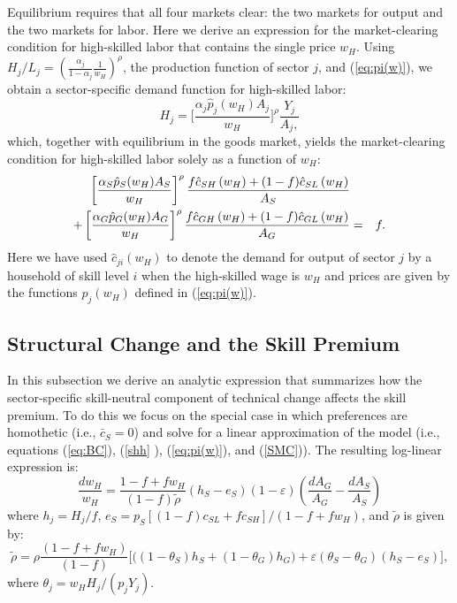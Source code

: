 \documentclass[12pt,english]{article}
\begin{document}
{\normalsize Equilibrium requires that all four markets clear: the two
markets for output and the two markets for labor. Here we derive an
expression for the market-clearing condition for high-skilled labor that
contains the single price $w_{H}$. Using $H_{j}/L_{j}=\left( \frac{\alpha
_{j}}{1-\alpha _{j}}\frac{1}{w_{H}}\right) ^{\rho }$, the production
function of sector $j$, and (\ref{eq:pi(w)}), we obtain a sector-specific
demand function for high-skilled labor: 
\begin{equation}
H_{j}=\bigg[\frac{\alpha _{j}\hat{p}_{j}(w_{H})A_{j}}{w_{H}}\bigg]^{\rho }%
\frac{Y_{j}}{A_{j},}  \label{H_i}
\end{equation}%
which, together with equilibrium in the goods market, yields the
market-clearing condition for high-skilled labor solely as a function of $%
w_{H}$: 
\begin{eqnarray}
\left[ \frac{\alpha _{S}\hat{p}_{S}(w_{H})A_{S}}{w_{H}}\right] ^{\rho }\frac{%
f\hat{c}_{SH}\left( w_{H}\right) +(1-f)\hat{c}_{SL}\left( w_{H}\right) }{%
A_{S}} &&  \notag \\
+\left[ \frac{\alpha _{G}\hat{p}_{G}(w_{H})A_{G}}{w_{H}}\right] ^{\rho }%
\frac{f\hat{c}_{GH}\left( w_{H}\right) +(1-f)\hat{c}_{GL}\left( w_{H}\right) 
}{A_{G}} &=&f.  \label{SMC}
\end{eqnarray}%
Here we have used $\hat{c}_{ji}(w_{H})$ to denote the demand for output of
sector $j$ by a household of skill level $i$ when the high-skilled wage is $%
w_{H}$ and prices are given by the functions $\hat{p}_{j}(w_{H})$ defined in
(\ref{eq:pi(w)}). }

\subsection{Structural Change and the Skill Premium}

{\normalsize In this subsection we derive an analytic expression that
summarizes how the sector-specific skill-neutral component of technical
change affects the skill premium. To do this we focus on the special case in
which preferences are homothetic (i.e., $\bar{c}_{S}=0$) and solve for a
linear approximation of the model (i.e., equations (\ref{eq:BC}), (\ref{shh}%
), (\ref{eq:pi(w)}), and (\ref{SMC})). The resulting log-linear expression
is: 
\begin{equation*}
\frac{dw_{H}}{w_{H}}=\frac{1-f+fw_{H}}{(1-f)\tilde{\rho}}\left(
h_{S}-e_{S}\right) \left( 1-\varepsilon \right) \left( \frac{dA_{G}}{A_{G}}-%
\frac{dA_{S}}{A_{S}}\right)
\end{equation*}%
where $h_{j}=H_{j}/f$, $e_{S}=p_{S}\left[ (1-f)c_{SL}+fc_{SH}\right]
/(1-f+fw_{H})$, and $\tilde{\rho}$ is given by: 
\begin{equation*}
\tilde{\rho}=\rho \frac{\left( 1-f+fw_{H}\right) }{(1-f)}\Bigg[ \Big( \left(
1-\theta _{S}\right) h_{S}+\left( 1-\theta _{G}\right) h_{G}\Big) %
+\varepsilon \left( \theta _{S}-\theta _{G}\right) \left( h_{S}-{e}%
_{S}\right) \Bigg] ,
\end{equation*}%
where $\theta _{j}=w_{H}H_{j}/(p_{j}Y_{j})$. }
\end{document}
